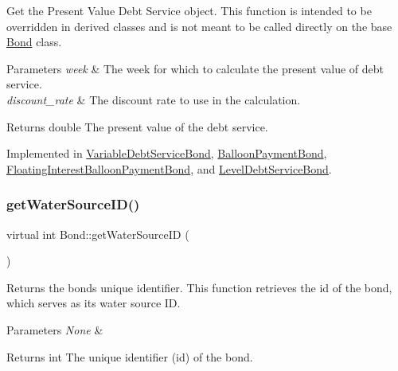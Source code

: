 Get the Present Value Debt Service object. This function is intended to be overridden in derived classes and is not meant to be called directly on the base {\ttfamily \mbox{\hyperlink{classBond}{Bond}}} class. 


\begin{DoxyParams}{Parameters}
{\em week} & The week for which to calculate the present value of debt service. \\
\hline
{\em discount\+\_\+rate} & The discount rate to use in the calculation. \\
\hline
\end{DoxyParams}
\begin{DoxyReturn}{Returns}
double The present value of the debt service. 
\end{DoxyReturn}


Implemented in \mbox{\hyperlink{classVariableDebtServiceBond_aa5ad4fcc7c65154105388b332ae98198}{Variable\+Debt\+Service\+Bond}}, \mbox{\hyperlink{classBalloonPaymentBond_ae038863f7a3408c2c8cd503d8e789f2d}{Balloon\+Payment\+Bond}}, \mbox{\hyperlink{classFloatingInterestBalloonPaymentBond_a91b2fef92f90049a3ba13bcd27c0eff2}{Floating\+Interest\+Balloon\+Payment\+Bond}}, and \mbox{\hyperlink{classLevelDebtServiceBond_a37801ecfc13ae1b6e05b4330398a7582}{Level\+Debt\+Service\+Bond}}.

\mbox{\label{classBond_a8190ab6482e6a9481afca4840147527e}} 
\subsubsection{\texorpdfstring{get\+Water\+Source\+I\+D()}{getWaterSourceID()}}
{\footnotesize\ttfamily virtual int Bond\+::get\+Water\+Source\+ID (\begin{DoxyParamCaption}{ }\end{DoxyParamCaption})\hspace{0.3cm}{\ttfamily [virtual]}}



Returns the bond\textquotesingle{}s unique identifier. This function retrieves the {\ttfamily id} of the bond, which serves as its water source ID. 


\begin{DoxyParams}{Parameters}
{\em None} & \\
\hline
\end{DoxyParams}
\begin{DoxyReturn}{Returns}
int The unique identifier ({\ttfamily id}) of the bond. 
\end{DoxyReturn}


